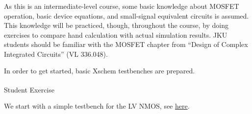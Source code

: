 \documentclass[
  a4paper,
  DIV=11,
  numbers=noendperiod]{scrartcl}
\makeatletter
\let\oldparagraph\paragraph
\renewcommand{\paragraph}{
    \@ifstar
      \xxxParagraphStar
      \xxxParagraphNoStar
  }
\newcommand{\xxxParagraphStar}[1]{\oldparagraph*{#1}\mbox{}}
\newcommand{\xxxParagraphNoStar}[1]{\oldparagraph{#1}\mbox{}}
\makeatother
\begin{document}
As this is an intermediate-level course, some basic knowledge about
MOSFET operation, basic device equations, and small-signal equivalent
circuits is assumed. This knowledge will be practiced, though,
throughout the course, by doing exercises to compare hand calculation
with actual simulation results. JKU students should be familiar with the
MOSFET chapter from ``Design of Complex Integrated Circuits'' (VL
336.048).

In order to get started, basic Xschem testbenches are prepared.

\paragraph{Student Exercise}\label{student-exercise}

We start with a simple testbench for the LV NMOS, see
\href{https://xschem-viewer.com/?file=https\%3A\%2F\%2Fgithub.com\%2Fiic-jku\%2Fanalog-circuit-design\%2Fblob\%2Fmain\%2Fxschem\%2Fdc_lv_nmos.sch}{here}.
\end{document}
